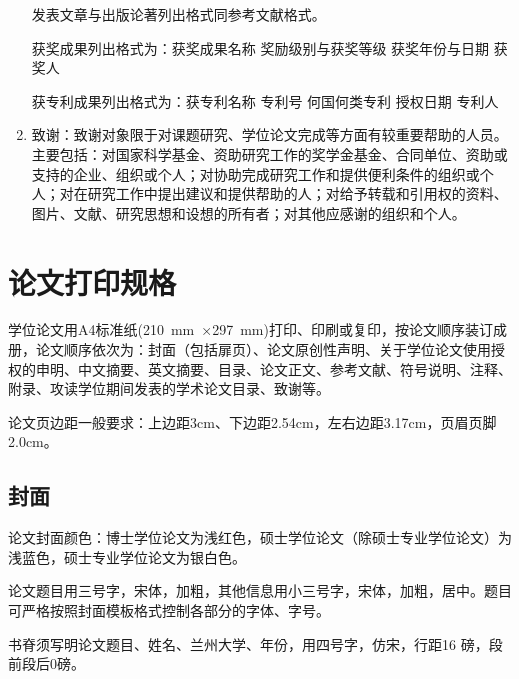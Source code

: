 \documentclass[twoside,longtitle]{LZUthesis}
\begin{document}
\begin{enumerate}
发表文章与出版论著列出格式同参考文献格式。


获奖成果列出格式为：获奖成果名称 奖励级别与获奖等级 获奖年份与日期 获奖人


获专利成果列出格式为：获专利名称 专利号 何国何类专利 授权日期 专利人

\item 致谢：致谢对象限于对课题研究、学位论文完成等方面有较重要帮助的人员。主要包括：对国家科学基金、资助研究工作的奖学金基金、合同单位、资助或支持的企业、组织或个人；对协助完成研究工作和提供便利条件的组织或个人；对在研究工作中提出建议和提供帮助的人；对给予转载和引用权的资料、图片、文献、研究思想和设想的所有者；对其他应感谢的组织和个人。
\end{enumerate}

\section{论文打印规格}

学位论文用A4标准纸(210~mm~×297~mm)打印、印刷或复印，按论文顺序装订成册，论文顺序依次为：封面（包括扉页）、论文原创性声明、关于学位论文使用授权的申明、中文摘要、英文摘要、目录、论文正文、参考文献、符号说明、注释、附录、攻读学位期间发表的学术论文目录、致谢等。

论文页边距一般要求：上边距3cm、下边距2.54cm，左右边距3.17cm，页眉页脚2.0cm。


\subsection{封面}

论文封面颜色：博士学位论文为浅红色，硕士学位论文（除硕士专业学位论文）为浅蓝色，硕士专业学位论文为银白色。

论文题目用三号字，宋体，加粗，其他信息用小三号字，宋体，加粗，居中。题目可严格按照封面模板格式控制各部分的字体、字号。

书脊须写明论文题目、姓名、兰州大学、年份，用四号字，仿宋，行距16 磅，段前段后0磅。
\end{document}
